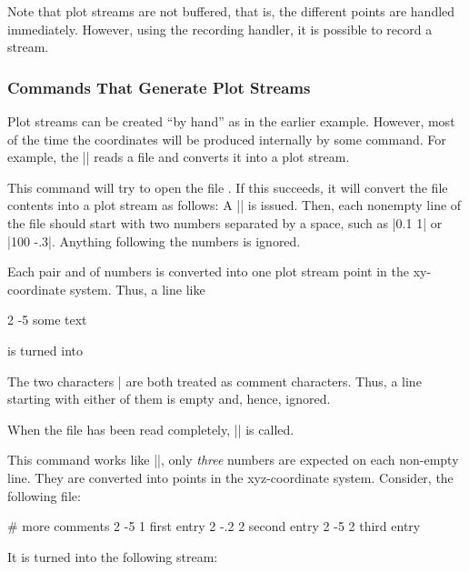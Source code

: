Note that plot streams are not buffered, that is, the different points
are handled immediately. However, using the recording handler, it is
possible to record a stream.

\subsubsection{Commands That Generate Plot Streams}

Plot streams can be created ``by hand'' as in the earlier
example. However, most of the time the coordinates will be produced
internally by some command. For example, the |\pgfplotxyfile| reads a
file and converts it into a plot stream.

\begin{command}{\pgfplotxyfile{}}
  This command will try to open the file . If this
  succeeds, it will convert the file contents into a plot stream as
  follows: A |\pgfplotstreamstart| is issued. Then, each nonempty line
  of the file should start with two numbers separated by a space, such
  as |0.1 1| or |100 -.3|. Anything following the numbers is ignored.

  Each pair  and  of numbers is converted into one
  plot stream point in the xy-coordinate system. Thus, a line like
\begin{codeexample}
2 -5 some text
\end{codeexample}
  is turned into 
\begin{codeexample}
\end{codeexample}

  The two characters |%
  are both treated as comment characters. Thus, a line starting with
  either of them is empty and, hence, ignored.

  When the file has been read completely, |\pgfplotstreamend| is
  called. 
\end{command}


\begin{command}{\pgfplotxyzfile{}}
  This command works like |\pgfplotxyfile|, only \emph{three} numbers
  are expected on each non-empty line. They are converted into points
  in the xyz-coordinate system. Consider, the following file:
\begin{codeexample}
# more comments
2 -5  1 first entry
2 -.2 2 second entry
2 -5  2 third entry
\end{codeexample}
  It is turned into the following stream:
\begin{codeexample}
\pgfplotstreamstart
{}
\pgfplotstreamend
\end{codeexample}
\end{command}


